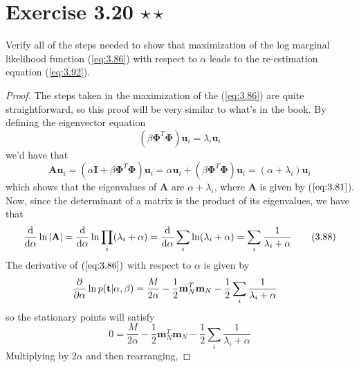 \section*{Exercise 3.20 $\star \star$}
Verify all of the steps needed to show that 
maximization of the log marginal likelihood function (\ref{eq:3.86}) with
respect to $\alpha$ leads to the re-estimation equation (\ref{eq:3.92}).

\vspace{1em}
        
\begin{proof}
    The steps taken in the maximization of the (\ref{eq:3.86})
    are quite straightforward, so this proof will be very similar 
    to what's in the book. By defining the eigenvector equation
    \begin{equation*}
        (\beta \mathbf{\Phi}^T\mathbf{\Phi})\mathbf{u}_i = \lambda_i \mathbf{u}_i
        \tag{3.87}\label{eq:3.87}
    \end{equation*}
    we'd have that
    \[
        \mathbf{A}\mathbf{u}_i 
        = (\alpha\mathbf{I} + \beta\mathbf{\Phi}^T\mathbf{\Phi})\mathbf{u}_i
        = \alpha\mathbf{u}_i + (\beta \mathbf{\Phi}^T\mathbf{\Phi})\mathbf{u}_i
        = (\alpha + \lambda_i) \mathbf{u}_i
    \] 
    which shows that the eigenvalues of $\mathbf{A}$ are $\alpha + \lambda_i$,
    where $\mathbf{A}$ is given by ($\ref{eq:3.81}$).
    Now, since the determinant of a matrix is the product of its eigenvalues, 
    we have that
    \begin{equation*}
        \dv{\alpha} \ln|\mathbf{A}| 
        = \dv{\alpha} \ln \prod_{i}(\lambda_i + \alpha)
        = \dv{\alpha} \sum_i \ln(\lambda_i + \alpha)
        = \sum_i \frac{1}{\lambda_i + \alpha}
        \tag{3.88}\label{eq:3.88}
    \end{equation*}
    The derivative of $(\ref{eq:3.86})$ with respect to $\alpha$ is given by
    \begin{align*}
        \pdv{\alpha} \ln p(\mathbf{t} | \alpha, \beta)
        &= \frac{M}{2\alpha} - \frac{1}{2} \mathbf{m}_N^T\mathbf{m}_N 
        - \frac{1}{2} \sum_i\frac{1}{\lambda_i + \alpha}
    \end{align*}
    so the stationary points will satisfy
    \begin{equation*}
        0 = \frac{M}{2\alpha} - \frac{1}{2} \mathbf{m}_N^T\mathbf{m}_N 
        - \frac{1}{2} \sum_{i} \frac{1}{\lambda_i + \alpha}
        \tag{3.89}\label{eq:3.89}
    \end{equation*}
    Multiplying by $2\alpha$ and then rearranging,

\end{proof}
